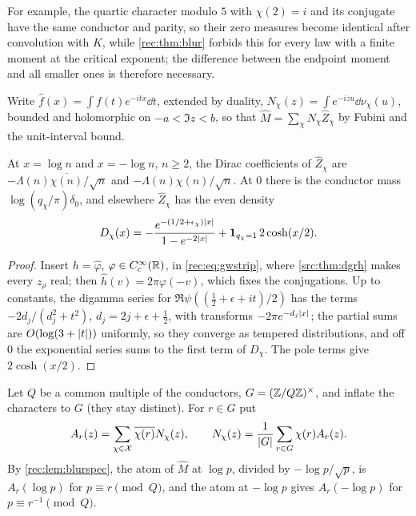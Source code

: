 For example, the quartic character modulo $5$ with $\chi(2)=i$ and its conjugate have the same conductor and
parity, so their zero measures become identical after convolution with $K$, while \cref{rec:thm:blur} forbids this
for every law with a finite moment at the critical exponent; the difference between the endpoint moment
and all smaller ones is therefore necessary.

Write $\widehat f(x)=\int f(t)e^{-itx}\dd t$, extended by duality, $N_\chi(z)=\int e^{-izu}\dd\nu_\chi(u)$, bounded and holomorphic on
$-a<\Im z<b$, so that $\widehat M=\sum_\chi N_\chi\widehat Z_\chi$ by Fubini and the unit-interval bound.

\begin{lemma}\label{rec:lem:blurspec}
At $x=\log n$ and $x=-\log n$, $n\ge2$, the Dirac coefficients of $\widehat Z_\chi$ are $-\Lambda(n)\overline{\chi(n)}/\sqrt n$ and
$-\Lambda(n)\chi(n)/\sqrt n$. At $0$ there is the conductor mass $\log(q_\chi/\pi)\delta_0$, and elsewhere $\widehat Z_\chi$ has the even density
\[
 D_\chi(x)=-\frac{e^{-(1/2+\epsilon_\chi)\lvert x\rvert}}{1-e^{-2\lvert x\rvert}}+\mathbf 1_{q_\chi=1}\,2\cosh(x/2).
\]
\end{lemma}

\begin{proof}
Insert $h=\widehat\varphi$, $\varphi\in C_c^\infty(\mathbb{R})$, in \eqref{rec:eq:gwstrip}, where \cref{src:thm:dgrh} makes every $z_\rho$ real; then
$\widehat h(v)=2\pi\varphi(-v)$, which fixes the conjugations. Up to constants, the digamma series for
$\Re\psi((\tfrac12+\epsilon+it)/2)$ has the terms $-2d_j/(d_j^2+t^2)$, $d_j=2j+\epsilon+\tfrac12$, with transforms $-2\pi e^{-d_j\lvert x\rvert}$; the partial sums
are $O(\log(3+\lvert t\rvert))$ uniformly, so they converge as tempered distributions, and off $0$ the exponential
series sums to the first term of $D_\chi$. The pole terms give $2\cosh(x/2)$.
\end{proof}

Let $Q$ be a common multiple of the conductors, $G=(\mathbb{Z}/Q\mathbb{Z})^\times$, and inflate the characters to $G$ (they stay
distinct). For $r\in G$ put
\begin{equation}\label{rec:eq:blurrow}
 A_r(z)=\sum_{\chi\in\mathcal X}\overline{\chi(r)}N_\chi(z),\qquad N_\chi(z)=\frac1{\lvert G\rvert}\sum_{r\in G}\chi(r)A_r(z).
\end{equation}
By \cref{rec:lem:blurspec}, the atom of $\widehat M$ at $\log p$, divided by $-\log p/\sqrt p$, is $A_r(\log p)$ for $p\equiv r\pmod Q$, and the
atom at $-\log p$ gives $A_r(-\log p)$ for $p\equiv r^{-1}\pmod Q$.

